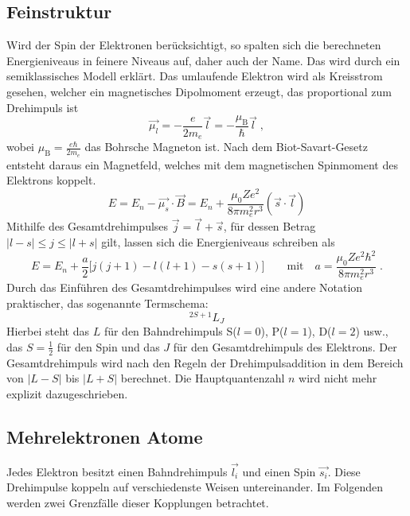     \subsection{Feinstruktur}
        Wird der Spin der Elektronen berücksichtigt, so spalten sich die berechneten Energieniveaus in feinere Niveaus auf, daher auch der Name.
        Das wird durch ein semiklassisches Modell erklärt.
        Das umlaufende Elektron wird als Kreisstrom gesehen, welcher ein magnetisches Dipolmoment erzeugt, das proportional zum Drehimpuls ist
        \begin{equation}
            \label{eqn:magnMoment}
            \vec{\mu_l} = -\frac{e}{2m_e} \vec{l} = - \frac{\mu_{\text{B}}}{\hbar} \vec{l} \;,
        \end{equation}
        wobei $\mu_{\text{B}} = \frac{e \hbar}{2 m_e}$ das Bohrsche Magneton ist.
        Nach dem Biot-Savart-Gesetz entsteht daraus ein Magnetfeld, welches mit dem magnetischen Spinmoment des Elektrons koppelt.
        \begin{equation}
            E = E_n - \vec{\mu_s} \cdot \vec{B} = E_n + \frac{\mu_0 Z e^2}{8 \pi m_e^2 r^3} \left(\vec{s} \cdot \vec{l}\right)
        \end{equation}
        Mithilfe des Gesamtdrehimpulses $\vec{j} = \vec{l} + \vec{s}$, für dessen Betrag $\vert l-s \vert \leq j \leq \vert l+s \vert$ gilt, lassen sich die Energieniveaus schreiben als
        \begin{equation}
            E = E_n + \frac{a}{2} \bigl[j(j+1) - l(l+1) - s(s+1)\bigr] \qquad \text{mit} \quad a = \frac{\mu_0 Z e^2 \hbar^2}{8 \pi m_e^2 r^3} \;.
        \end{equation}
        Durch das Einführen des Gesamtdrehimpulses wird eine andere Notation praktischer, das sogenannte Termschema:
        \begin{equation}
            \label{eqn:termschema}
            ^{2S+1}L_J
        \end{equation}
        Hierbei steht das $L$ für den Bahndrehimpuls S($l=0$), P($l=1$), D($l=2$) usw., das $S = \frac{1}{2}$ für den Spin und das $J$ für den Gesamtdrehimpuls des Elektrons.
        Der Gesamtdrehimpuls wird nach den Regeln der Drehimpulsaddition in dem Bereich von $|L - S|$ bis $|L + S|$ berechnet.
        Die Hauptquantenzahl $n$ wird nicht mehr explizit dazugeschrieben.

    \subsection{Mehrelektronen Atome}
        Jedes Elektron besitzt einen Bahndrehimpuls $\vec{l_i}$ und einen Spin $\vec{s_i}$. Diese Drehimpulse koppeln auf verschiedenste Weisen untereinander. Im Folgenden werden zwei Grenzfälle dieser Kopplungen betrachtet.

